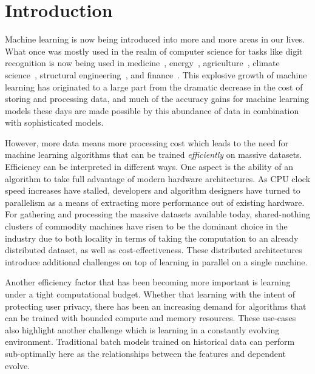 \chapter{Introduction}

Machine learning is now being introduced into more and more areas in
our lives. What once was mostly used in the realm of computer science for
tasks like digit recognition \cite{mnist} is now being used
in medicine~\cite{health-ml-1, health-ml-2}, energy~\cite{ml-building, ml-energy},
agriculture~\cite{ml-agriculture, ml-agriculture-2},
climate science~\cite{ml-climate-science}, structural engineering~\cite{ml-engineering},
and finance~\cite{ml-finance}. This explosive growth of machine learning has originated
to a large part from the dramatic decrease in the cost of storing and processing
data, and much of the accuracy gains for machine learning models these
days are made possible by this abundance of data in combination with sophisticated
models.

However, more data means more processing cost which leads to the need for
machine learning algorithms that can be trained \emph{efficiently} on massive
datasets. Efficiency can be interpreted in different ways. One
aspect is the ability of an algorithm to take full advantage of modern
hardware architectures. As CPU clock speed increases have stalled, developers
and algorithm designers have turned to parallelism as a means of
extracting more performance out of existing hardware.
For gathering and processing the massive datasets available today,
shared-nothing clusters of commodity machines have risen to
be the dominant choice in the industry due to both locality
in terms of taking the computation to an already distributed
dataset, as well as cost-effectiveness. These distributed
architectures introduce additional challenges on top of
learning in parallel on a single machine.

Another efficiency factor that has been becoming more important
is learning under a tight computational budget. Whether that
learning with the intent of protecting user privacy, there has
been an increasing demand for algorithms that can be trained
with bounded compute and memory resources.
These use-cases also highlight another challenge which is learning
in a constantly evolving environment. Traditional batch
models trained on historical data can perform sub-optimally here as the
relationships between the features and dependent evolve.

